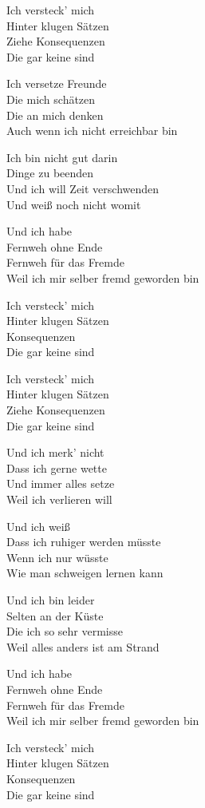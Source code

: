\documentclass[]{book}
\begin{document}
Ich versteck' mich\\
Hinter klugen Sätzen\\
Ziehe Konsequenzen\\
Die gar keine sind

Ich versetze Freunde\\
Die mich schätzen\\
Die an mich denken\\
Auch wenn ich nicht erreichbar bin

Ich bin nicht gut darin\\
Dinge zu beenden\\
Und ich will Zeit verschwenden\\
Und weiß noch nicht womit

Und ich habe\\
Fernweh ohne Ende\\
Fernweh für das Fremde\\
Weil ich mir selber fremd geworden bin

Ich versteck' mich\\
Hinter klugen Sätzen\\
Konsequenzen\\
Die gar keine sind

Ich versteck' mich\\
Hinter klugen Sätzen\\
Ziehe Konsequenzen\\
Die gar keine sind

Und ich merk' nicht\\
Dass ich gerne wette\\
Und immer alles setze\\
Weil ich verlieren will

Und ich weiß\\
Dass ich ruhiger werden müsste\\
Wenn ich nur wüsste\\
Wie man schweigen lernen kann

Und ich bin leider\\
Selten an der Küste\\
Die ich so sehr vermisse\\
Weil alles anders ist am Strand

Und ich habe\\
Fernweh ohne Ende\\
Fernweh für das Fremde\\
Weil ich mir selber fremd geworden bin

Ich versteck' mich\\
Hinter klugen Sätzen\\
Konsequenzen\\
Die gar keine sind
\end{document}
